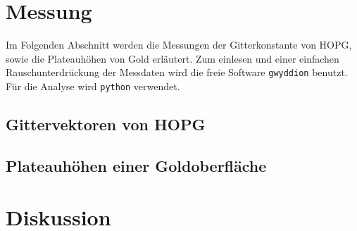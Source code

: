 \section{Messung} %
\label{sec:messung}
Im Folgenden Abschnitt werden die Messungen der Gitterkonstante von HOPG, sowie
die Plateauhöhen von Gold erläutert.
Zum einlesen und einer einfachen Rauschunterdrückung der Messdaten wird die
freie Software \texttt{gwyddion} benutzt. Für die Analyse wird \texttt{python}
verwendet.

\subsection{Gittervektoren von HOPG}
\label{subsec:gitter}

\subsection{Plateauhöhen einer Goldoberfläche}
\label{subsec:gold}

\section{Diskussion}
\label{sec:diskussion}

